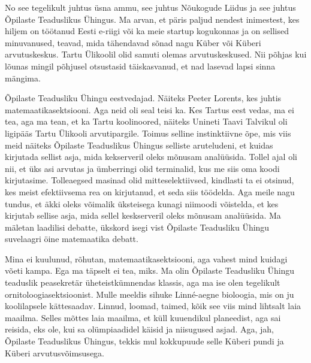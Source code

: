 

No see tegelikult juhtus üsna ammu, see juhtus Nõukogude Liidus ja see juhtus 
Õpilaste Teaduslikus Ühingus. Ma arvan, et 
päris paljud nendest inimestest, kes hiljem  on töötanud Eesti e-riigi või ka 
meie startup kogukonnas ja on sellised minuvanused,  teavad, mida tähendavad 
sõnad nagu Küber või Küberi arvutuskeskus. Tartu 
Ülikoolil olid samuti olemas arvutuskeskused. Nii põhjas 
kui lõunas mingil põhjusel otsustasid täiskasvanud, et nad lasevad lapsi sinna 
mängima. 


Õpilaste Teadusliku Ühingu eestvedajad. Näiteks Peeter 
Lorents, kes juhtis matemaatikasektsiooni. Aga neid 
oli seal teisi ka. Kes Tartus eest vedas, ma ei tea, aga ma tean, et ka Tartu 
koolinoored, näiteks Unineti Taavi Talvikul oli ligipääs Tartu Ülikooli arvutipargile. Toimus selline instinktiivne 
õpe, mis viis meid näiteks Õpilaste Teaduslikus Ühingus selliste aruteludeni, 
et kuidas kirjutada sellist asja, mida kekserveril oleks mõnusam analüüsida. 
Tollel ajal oli nii, et üks asi arvutas ja ümberringi olid terminalid, kus me 
siis oma koodi kirjutasime. Tolleaegsed masinad olid mitteselektiivsed, 
kindlasti ta ei otsinud, kes meist efektiivsema rea on kirjutanud, et seda siis 
töödelda. Aga meile nagu tundus, et äkki oleks võimalik üksteisega kunagi 
niimoodi võistelda, et kes kirjutab sellise asja, mida sellel keskserveril 
oleks mõnusam analüüsida. Ma mäletan laadilisi debatte, ükskord isegi vist 
Õpilaste Teadusliku Ühingu suvelaagri öine matemaatika debatt. 

Mina ei kuulunud, rõhutan, matemaatikasektsiooni, aga vahest mind kuidagi võeti 
kampa. Ega ma täpselt ei tea, miks. Ma olin Õpilaste Teadusliku Ühingu 
teaduslik peasekretär üheteistkümnendas klassis, aga ma ise olen tegelikult 
ornitoloogiasektsioonist. Mulle meeldis sihuke Linné-aegne 
bioloogia, mis on ju 
koolilapsele kättesaadav. Linnud, loomad, taimed, kõik see viis mind lihtsalt 
laia maailma. Selles mõttes laia maailma, et  küll kuuendikul planeedist, aga 
sai reisida, eks ole, kui sa olümpiaadidel käisid ja niisugused asjad. Aga, 
jah, Õpilaste Teaduslikus Ühingus,  tekkis mul kokkupuude selle Küberi pundi ja 
Küberi arvutusvõimsusega.

